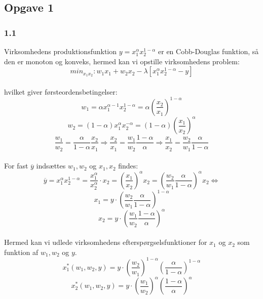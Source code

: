 \documentclass[a4paper, 12pt]{article}
\begin{document}
 



\subsection*{Opgave 1}
\subsubsection*{1.1}
Virksomhedens produktionsfunktion $y = x_{1}^{\alpha}x_{2}^{1- \alpha}$ er en Cobb-Douglas funktion, så den er monoton og konveks, hermed kan vi opstille virksomhedens problem:
$$min_{x_{1}x_{2}} : w_{1}x_{1} + w_{2}x_{2} - \lambda[x_{1}^{\alpha}x_{2}^{1- \alpha} -y]$$
\\
hvilket giver førsteordensbetingelser:
$$w_{1} =  \alpha x_{1}^{\alpha -1} x_{2}^{1- \alpha} =\alpha \left( \dfrac{x_{2}}{x_{1}} \right)^{1 - \alpha}$$
$$w_{2} =  (1- \alpha)x_{1}^{\alpha}x_{2}^{- \alpha} = (1 - \alpha) \left( \dfrac{x_{1}}{x_{2}} \right)^{\alpha} $$
$$\dfrac{w_{1}}{w_{2}} = \dfrac{\alpha}{1 - \alpha} \dfrac{x_{2}}{x_{1}} \Rightarrow \dfrac{x_{2}}{x_{1}}  = \dfrac{w_{1}}{w_{2}} \dfrac{1 - \alpha}{\alpha} \Rightarrow \dfrac{x_{1}}{x_{2}} = \dfrac{w_{2}}{w_{1}} \dfrac{\alpha}{1 - \alpha}$$
\\
For fast $\overline{y}$ indsættes $w_{1},w_{2}$ og $x_{1},x_{2}$ findes:
$$\overline{y} = x_{1}^{\alpha}x_{2}^{1 - \alpha} = \dfrac{x_{1}^{\alpha}}{x_{2}^{\alpha}} \cdot x_{2} = \left( \dfrac{x_{1}}{x_{2}} \right)^{\alpha} x_{2} = \left( \dfrac{w_{2}}{w_{1}} \dfrac{\alpha}{1 - \alpha} \right)^{\alpha} x_{2} \Leftrightarrow$$
$$x_{1} = y \cdot  \left( \dfrac{w_{2}}{w_{1}} \dfrac{\alpha}{1 - \alpha} \right)^{1 - \alpha}$$
$$x_{2} = y \cdot  \left( \dfrac{w_{1}}{w_{2}} \dfrac{1 - \alpha}{\alpha} \right)^{\alpha}$$
\\
Hermed kan vi udlede virksomhedens efterspørgselsfunktioner for $x_{1}$ og $x_{2}$ som funktion af $w_{1},w_{2}$ og $y$.
$$x_{1}^{*}(w_{1},w_{2},y) = y \cdot  \left( \dfrac{w_{2}}{w_{1}} \right)^{1 - \alpha} \left( \dfrac{\alpha}{1 - \alpha} \right)^{1 - \alpha}$$
$$x_{2}^{*}(w_{1},w_{2},y) = y \cdot  \left( \dfrac{w_{1}}{w_{2}} \right)^{\alpha}  \left( \dfrac{1 - \alpha}{\alpha} \right)^{\alpha}$$


\end{document}
